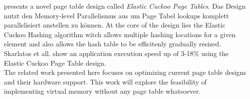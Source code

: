 
\textbf{\cite{skarlatos2020elastic}} presents a novel page table design called \textit{Elastic Cuckoo Page
    Tables}. Das Design nutzt den Memory-level Parallelismus aus um Page Tabel lookups komplett parallelisiert
anstellen zu können. At the core of the design lies the Elastic Cuckoo Hashing algorithm witch allows
multiple hashing locations for a given element and also allows the hash table to be efficitenly gradually
resized. Skarlatos et all. show an application execution speed up of 3-18\% using the Elastic Cuckoo
Page Table design.\\



The related work presented here focuses on optimizing current page table designs and their hardware
support. This work will explore the feasibility of implementing virtual memory without any page table
whatsoever. %